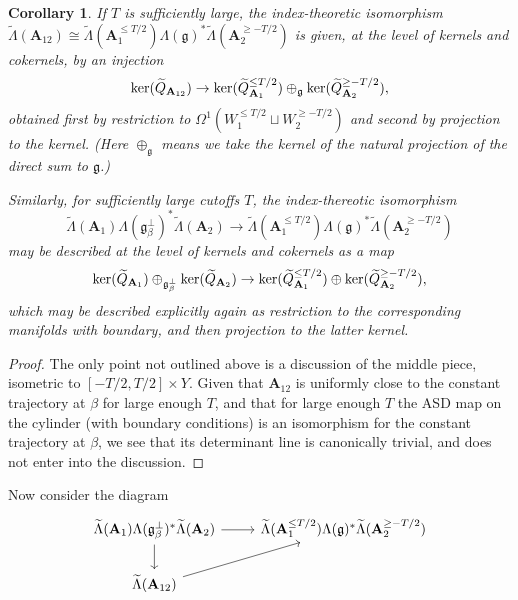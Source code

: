 \documentclass{memo-l}
\newtheorem{corollary}[theorem]{Corollary}
\theoremstyle{definition}
\theoremstyle{remark}
\numberwithin{section}{chapter}
\numberwithin{equation}{chapter}
\begin{document}
\begin{corollary}If $T$ is sufficiently large, the index-theoretic isomorphism $\widetilde{\Lambda}(\mathbf{A}_{12}) \cong \widetilde{\Lambda}(\mathbf{A}_1^{\leq T/2}) \Lambda(\mathfrak g)^* \widetilde{\Lambda}(\mathbf{A}_2^{\geq -T/2})$ is given, at the level of kernels and cokernels, by an injection $$\textup{ker}(\widetilde{Q}_{\mathbf{A}_{12}}) \to \textup{ker}(\widetilde{Q}^{\leq T/2}_{\mathbf{A}_1}) \oplus_{\mathfrak g} \textup{ker}(\widetilde Q^{\geq -T/2}_{\mathbf{A}_2}),$$ obtained first by restriction to $\Omega^1(W_1^{\leq T/2} \sqcup W_2^{\geq -T/2})$ and second by projection to the kernel. (Here $\oplus_{\mathfrak g}$ means we take the kernel of the natural projection of the direct sum to $\mathfrak g$.)

Similarly, for sufficiently large cutoffs $T$, the index-thereotic isomorphism $$\widetilde{\Lambda}(\mathbf{A}_1) \Lambda(\mathfrak g_\beta^\perp)^* \widetilde{\Lambda}(\mathbf{A}_2) \to \widetilde{\Lambda}(\mathbf{A}_1^{\leq T/2}) \Lambda(\mathfrak g)^*  \widetilde{\Lambda}(\mathbf{A}_2^{\geq -T/2})$$ may be described at the level of kernels and cokernels as a map $$\textup{ker}(\widetilde Q_{\mathbf{A}_1}) \oplus_{\mathfrak g_\beta^\perp} \textup{ker}(\widetilde Q_{\mathbf{A}_2}) \to \textup{ker}(\widetilde Q^{\leq T/2}_{\mathbf{A}_1}) \oplus \textup{ker}(\widetilde Q^{\geq -T/2}_{\mathbf{A}_2}),$$ which may be described explicitly again as restriction to the corresponding manifolds with boundary, and then projection to the latter kernel.
\end{corollary}
\begin{proof}The only point not outlined above is a discussion of the middle piece, isometric to $[-T/2, T/2] \times Y$. Given that $\mathbf{A}_{12}$ is uniformly close to the constant trajectory at $\beta$ for large enough $T$, and that for large enough $T$ the ASD map on the cylinder (with boundary conditions) is an isomorphism for the constant trajectory at $\beta$, we see that its determinant line is canonically trivial, and does not enter into the discussion.
\end{proof}

Now consider the diagram
\[
\begin{tikzcd}\widetilde{\Lambda}(\mathbf{A}_1) \Lambda(\mathfrak g_\beta^\perp)^* \widetilde{\Lambda}(\mathbf{A}_2) \arrow{r} \arrow{d} & \widetilde{\Lambda}(\mathbf{A}_1^{\leq T/2}) \Lambda(\mathfrak g)^* \widetilde{\Lambda}(\mathbf{A}_2^{\geq -T/2}) \\
\widetilde{\Lambda}(\mathbf{A}_{12}) \arrow{ur}
\end{tikzcd}
\]
\end{document}
